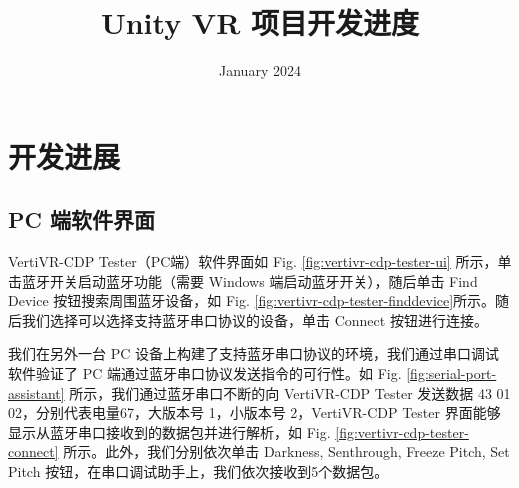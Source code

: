 \documentclass[a4paper,10pt]{article}
\begin{document}
	
	
	\title{\songti {}Unity VR 项目开发进度}
	\date{\textrm{January 2024}}
	\maketitle
	
	\renewcommand{\figurename}{Figure} %
	\renewcommand{\contentsname}{Contents}
	\renewcommand{\tablename}{Table}
	\tableofcontents  %
		
	\section{开发进展}

		\subsection{PC 端软件界面}	
		
		VertiVR-CDP Tester（PC端）软件界面如 Fig. \ref{fig:vertivr-cdp-tester-ui} 所示，单击蓝牙开关启动蓝牙功能（需要 Windows 端启动蓝牙开关），随后单击 Find Device 按钮搜索周围蓝牙设备，如 Fig. \ref{fig:vertivr-cdp-tester-finddevice}所示。随后我们选择可以选择支持蓝牙串口协议的设备，单击 Connect 按钮进行连接。
		
		我们在另外一台 PC 设备上构建了支持蓝牙串口协议的环境，我们通过串口调试软件验证了 PC 端通过蓝牙串口协议发送指令的可行性。如 Fig. \ref{fig:serial-port-assistant} 所示，我们通过蓝牙串口不断的向 VertiVR-CDP Tester 发送数据 43 01 02，分别代表电量67，大版本号 1，小版本号 2，VertiVR-CDP Tester 界面能够显示从蓝牙串口接收到的数据包并进行解析，如 Fig. \ref{fig:vertivr-cdp-tester-connect} 所示。此外，我们分别依次单击 Darkness, Senthrough, Freeze Pitch, Set Pitch 按钮，在串口调试助手上，我们依次接收到5个数据包。
		
\end{document}
